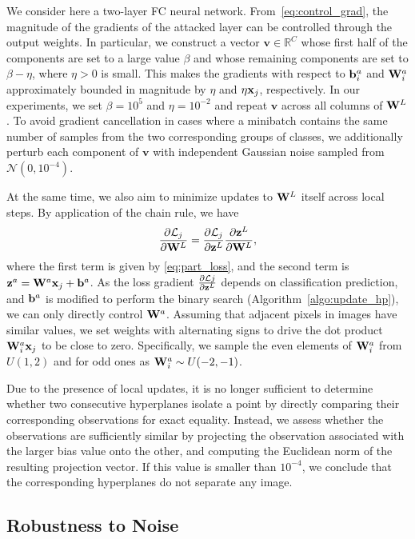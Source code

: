 We consider here a two-layer FC neural network. From~\eqref{eq:control_grad}, the magnitude of the gradients of the attacked layer can be controlled through the output weights. In particular, we construct a vector $\mathbf{v}\in\mathbb{R}^{C}$ whose first half of the components are set to a large value $\beta$ and whose remaining components are set to $\beta-\eta$, where $\eta>0$ is small. This makes the gradients with respect to ${\mathbf{b}}^{a}_i$ and $\mathbf{W}^{a}_i$ approximately bounded in magnitude by $\eta$ and $\eta{\mathbf{x}}_j$, respectively. In our experiments, we set $\beta=10^5$ and $\eta=10^{-2}$ and repeat $\mathbf{v}$ across all columns of $\mathbf{W}^{L}$. To avoid gradient cancellation in cases where a minibatch contains the same number of samples from the two corresponding groups of classes, we additionally perturb each component of $\mathbf{v}$ with independent Gaussian noise sampled from $\mathcal{N}(0,10^{-4})$.

At the same time, we also aim to minimize updates to $\mathbf{W}^{L}$ itself across local steps. By application of the chain rule, we have 
\begin{equation*}
    \frac{\partial \mathcal{L}_j}{\partial \mathbf{W}^{L}}= \frac{\partial \mathcal{L}_j}{\partial {\mathbf{z}}^{L}} \frac{\partial {\mathbf{z}}^{L}}{\partial \mathbf{W}^{L}},
\end{equation*}
where the first term is given by \eqref{eq:part_loss}, and the second term is ${\mathbf{z}}^{a} = \mathbf{W}^{a} {\mathbf{x}}_j + {\mathbf{b}}^{a}$. As the loss gradient $\frac{\partial \mathcal{L}j}{\partial {\mathbf{z}}^{L}}$ depends on classification prediction, and ${\mathbf{b}}^{a}$ is modified to perform the binary search (Algorithm~\ref{algo:update_hp}), we can only directly control $\mathbf{W}^{a}$.  Assuming that adjacent pixels in images have similar values, we set weights with alternating signs to drive the dot product $\mathbf{W}^{a}_i {\mathbf{x}}_j$ to be close to zero. Specifically, we sample the even elements of $\mathbf{W}^{a}_{i}$ from $U(1,2)$ and for odd ones as $\mathbf{W}^{a}_{i} \sim U(-2,-1)$.


Due to the presence of local updates, it is no longer sufficient to determine whether two consecutive hyperplanes isolate a point by directly comparing their corresponding observations for exact equality. Instead, we assess whether the observations are sufficiently similar by projecting the observation associated with the larger bias value onto the other, and computing the Euclidean norm of the resulting projection vector. If this value is smaller than $10^{-4}$, we conclude that the corresponding hyperplanes do not separate any image.

\subsection{Robustness to Noise}
\label{app:noise}

